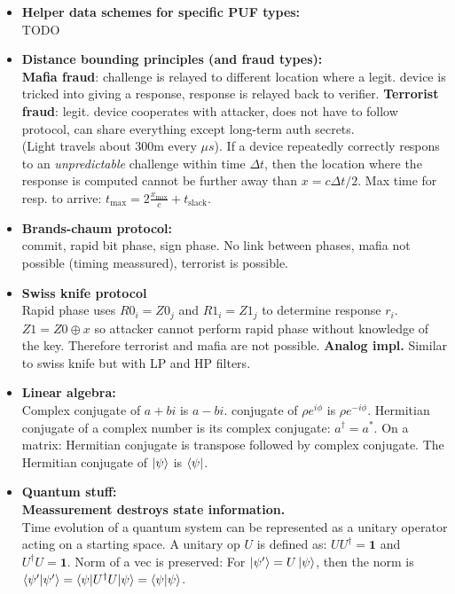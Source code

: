 \documentclass[twocolumn,9pt]{extarticle}
\begin{document}
\begin{itemize}
	\item \textbf{Helper data schemes for specific PUF types: } \\
	TODO

	\item \textbf{Distance bounding principles (and fraud types): } \\
	\textbf{Mafia fraud}: challenge is relayed to different location where a legit. device is tricked into giving a response, response is relayed back to verifier.
	\textbf{Terrorist fraud}: legit. device cooperates with attacker, does not have to follow protocol, can share everything except long-term auth secrets.\\
	(Light travels about 300m every $\mu s$). If a device repeatedly correctly respons to an \emph{unpredictable} challenge within time $\Delta t$, then the location where the response is computed cannot be further away than $x = c \Delta t/2$. Max time for resp. to arrive: $t_{\text{max}} = 2 \frac{x_{\text{max}}}{c} + t_{\text{slack}}$. 

	\item \textbf{Brands-chaum protocol: } \\
	commit, rapid bit phase, sign phase. No link between phases, mafia not possible (timing meassured), terrorist is possible.
	\item \textbf{Swiss knife protocol } \\
	Rapid phase uses $R0_i=Z0_j$ and $R1_i=Z1_j$ to determine response $r_i$. $Z1 = Z0 \oplus x$ so attacker cannot perform rapid phase without knowledge of the key. Therefore terrorist and mafia are not possible. \textbf{Analog impl.} Similar to swiss knife but with LP and HP filters.


	\item \textbf{Linear algebra:} \\
	Complex conjugate of $a+bi$ is $a-bi$. conjugate of $\rho e^{i \phi}$ is $\rho e^{-i \phi}$. Hermitian conjugate of a complex number is its complex conjugate: $a^\dagger = a^*$.
	On a matrix: Hermitian conjugate is transpose followed by complex conjugate.
	The Hermitian conjugate of $\ket{\psi}$ is $\bra{\psi}$.

	\item \textbf{Quantum stuff:} \\
	\textbf{Meassurement destroys state information.}\\
	Time evolution of a quantum system can be represented as a unitary operator acting on a starting space. A unitary op $U$ is defined as: $UU^\dagger = \mathbf{1}$ and $U^\dagger U = \mathbf{1}$. Norm of a vec is preserved: For $\ket{\psi'} = U\ket{\psi}$, then the norm is $\braket{\psi'|\psi'} = \braket{\psi|U^\dagger U|\psi} = \braket{\psi|\psi}$.


\end{itemize}
\end{document}
